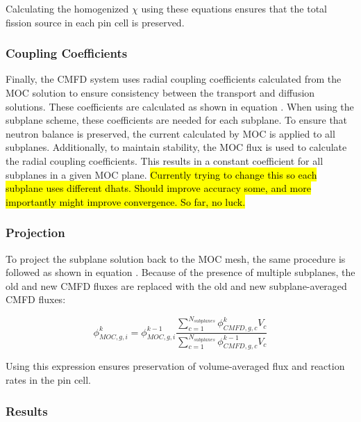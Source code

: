 Calculating the homogenized $\chi$ using these equations ensures that the total fission source in each pin cell is preserved.

\subsubsection{Coupling Coefficients}

Finally, the CMFD system uses radial coupling coefficients calculated from the MOC solution to ensure consistency between the transport and diffusion solutions.  These coefficients are calculated as shown in equation .  When using the subplane scheme, these coefficients are needed for each subplane.  To ensure that neutron balance is preserved, the current calculated by MOC is applied to all subplanes.  Additionally, to maintain stability, the MOC flux is used to calculate the radial coupling coefficients.  This results in a constant coefficient for all subplanes in a given MOC plane.  \hl{Currently trying to change this so each subplane uses different dhats.  Should improve accuracy some, and more importantly might improve convergence.  So far, no luck.}

\subsubsection{Projection}

To project the subplane solution back to the MOC mesh, the same procedure is followed as shown in equation .  Because of the presence of multiple subplanes, the old and new CMFD fluxes are replaced with the old and new subplane-averaged CMFD fluxes:

\begin{equation}
\phi_{MOC,g,i}^k = \phi_{MOC,g,i}^{k-1} \frac{\sum_{c=1}^{N_{subplanes}} \phi_{CMFD,g,c}^k V_c}{\sum_{c=1}^{N_{subplanes}} \phi_{CMFD,g,c}^{k-1} V_c}
\end{equation}

Using this expression ensures preservation of volume-averaged flux and reaction rates in the pin cell.

\subsubsection{Results}


